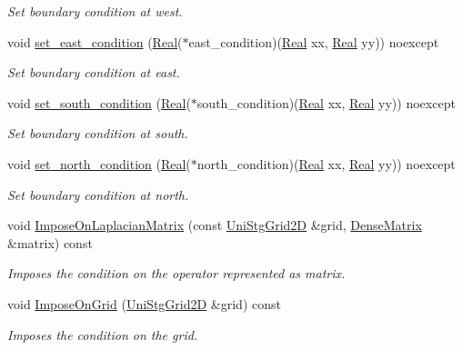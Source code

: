 \begin{DoxyCompactItemize}
\begin{DoxyCompactList}\small\item\em Set boundary condition at west. \end{DoxyCompactList}\item 
void \hyperlink{classmtk_1_1BCDescriptor2D_a4ba8690e845f59a1507b056f3fc8061e}{set\+\_\+east\+\_\+condition} (\hyperlink{group__c01-roots_gac080bbbf5cbb5502c9f00405f894857d}{Real}($\ast$east\+\_\+condition)(\hyperlink{group__c01-roots_gac080bbbf5cbb5502c9f00405f894857d}{Real} xx, \hyperlink{group__c01-roots_gac080bbbf5cbb5502c9f00405f894857d}{Real} yy)) noexcept
\begin{DoxyCompactList}\small\item\em Set boundary condition at east. \end{DoxyCompactList}\item 
void \hyperlink{classmtk_1_1BCDescriptor2D_a408f159cc44d7ee610191efb8ed48b2a}{set\+\_\+south\+\_\+condition} (\hyperlink{group__c01-roots_gac080bbbf5cbb5502c9f00405f894857d}{Real}($\ast$south\+\_\+condition)(\hyperlink{group__c01-roots_gac080bbbf5cbb5502c9f00405f894857d}{Real} xx, \hyperlink{group__c01-roots_gac080bbbf5cbb5502c9f00405f894857d}{Real} yy)) noexcept
\begin{DoxyCompactList}\small\item\em Set boundary condition at south. \end{DoxyCompactList}\item 
void \hyperlink{classmtk_1_1BCDescriptor2D_a690f6881a88b202c074d9f90f2a7ddb0}{set\+\_\+north\+\_\+condition} (\hyperlink{group__c01-roots_gac080bbbf5cbb5502c9f00405f894857d}{Real}($\ast$north\+\_\+condition)(\hyperlink{group__c01-roots_gac080bbbf5cbb5502c9f00405f894857d}{Real} xx, \hyperlink{group__c01-roots_gac080bbbf5cbb5502c9f00405f894857d}{Real} yy)) noexcept
\begin{DoxyCompactList}\small\item\em Set boundary condition at north. \end{DoxyCompactList}\item 
void \hyperlink{classmtk_1_1BCDescriptor2D_abade249fa28783a5383a7c2aaf570ea9}{Impose\+On\+Laplacian\+Matrix} (const \hyperlink{classmtk_1_1UniStgGrid2D}{Uni\+Stg\+Grid2\+D} \&grid, \hyperlink{classmtk_1_1DenseMatrix}{Dense\+Matrix} \&matrix) const 
\begin{DoxyCompactList}\small\item\em Imposes the condition on the operator represented as matrix. \end{DoxyCompactList}\item 
void \hyperlink{classmtk_1_1BCDescriptor2D_a5f0ff1fda1b5266dcd77ba2301c8ba2c}{Impose\+On\+Grid} (\hyperlink{classmtk_1_1UniStgGrid2D}{Uni\+Stg\+Grid2\+D} \&grid) const 
\begin{DoxyCompactList}\small\item\em Imposes the condition on the grid. \end{DoxyCompactList}\end{DoxyCompactItemize}
